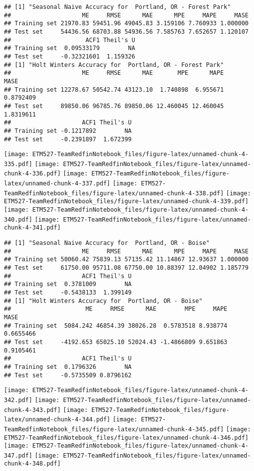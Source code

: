 \documentclass[]{article}
\begin{document}
\begin{verbatim}
## [1] "Seasonal Naive Accuracy for  Portland, OR - Forest Park"
##                    ME     RMSE      MAE      MPE     MAPE     MASE
## Training set 21970.83 59451.96 49045.83 3.159106 7.760933 1.000000
## Test set     54436.56 68703.88 54936.56 7.585763 7.652657 1.120107
##                     ACF1 Theil's U
## Training set  0.09533179        NA
## Test set     -0.32321601  1.159326
## [1] "Holt Winters Accuracy for  Portland, OR - Forest Park"
##                    ME     RMSE      MAE       MPE      MAPE      MASE
## Training set 12278.67 50542.74 43123.10  1.740898  6.955671 0.8792409
## Test set     89850.06 96785.76 89850.06 12.460045 12.460045 1.8319611
##                    ACF1 Theil's U
## Training set -0.1217892        NA
## Test set     -0.2391897  1.672399
\end{verbatim}

\texttt{[image: ETM527-TeamRedfinNotebook\_files/figure-latex/unnamed-chunk-4-335.pdf]}
\texttt{[image: ETM527-TeamRedfinNotebook\_files/figure-latex/unnamed-chunk-4-336.pdf]}
\texttt{[image: ETM527-TeamRedfinNotebook\_files/figure-latex/unnamed-chunk-4-337.pdf]}
\texttt{[image: ETM527-TeamRedfinNotebook\_files/figure-latex/unnamed-chunk-4-338.pdf]}
\texttt{[image: ETM527-TeamRedfinNotebook\_files/figure-latex/unnamed-chunk-4-339.pdf]}
\texttt{[image: ETM527-TeamRedfinNotebook\_files/figure-latex/unnamed-chunk-4-340.pdf]}
\texttt{[image: ETM527-TeamRedfinNotebook\_files/figure-latex/unnamed-chunk-4-341.pdf]}

\begin{verbatim}
## [1] "Seasonal Naive Accuracy for  Portland, OR - Boise"
##                    ME     RMSE      MAE      MPE     MAPE     MASE
## Training set 50060.42 75839.13 57135.42 11.14867 12.93637 1.000000
## Test set     61750.00 95711.08 67750.00 10.88397 12.04902 1.185779
##                    ACF1 Theil's U
## Training set  0.3781009        NA
## Test set     -0.5438133  1.399149
## [1] "Holt Winters Accuracy for  Portland, OR - Boise"
##                     ME     RMSE      MAE        MPE     MAPE      MASE
## Training set  5084.242 46854.39 38026.28  0.5783518 8.938774 0.6655466
## Test set     -4192.653 65025.10 52024.43 -1.4866809 9.651863 0.9105461
##                    ACF1 Theil's U
## Training set  0.1796326        NA
## Test set     -0.5735509 0.8796162
\end{verbatim}

\texttt{[image: ETM527-TeamRedfinNotebook\_files/figure-latex/unnamed-chunk-4-342.pdf]}
\texttt{[image: ETM527-TeamRedfinNotebook\_files/figure-latex/unnamed-chunk-4-343.pdf]}
\texttt{[image: ETM527-TeamRedfinNotebook\_files/figure-latex/unnamed-chunk-4-344.pdf]}
\texttt{[image: ETM527-TeamRedfinNotebook\_files/figure-latex/unnamed-chunk-4-345.pdf]}
\texttt{[image: ETM527-TeamRedfinNotebook\_files/figure-latex/unnamed-chunk-4-346.pdf]}
\texttt{[image: ETM527-TeamRedfinNotebook\_files/figure-latex/unnamed-chunk-4-347.pdf]}
\texttt{[image: ETM527-TeamRedfinNotebook\_files/figure-latex/unnamed-chunk-4-348.pdf]}
\end{document}

